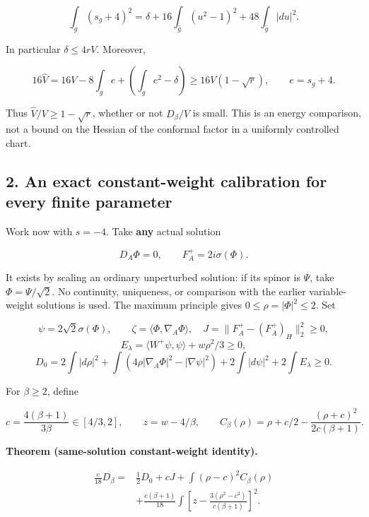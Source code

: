 \documentclass[
  10pt,
]{article}
\begin{document}
\[
 \boxed{\int_g(s_g+4)^2=\delta
 +16\int_{\widehat g}(u^2-1)^2+48\int_{\widehat g}|du|^2.}
 \tag{1.5}
\]

In particular \(\delta\le4rV\). Moreover,

\[
16\widehat V=16V-8\int_g e+\left(\int_g e^2-\delta\right)
\ge16V(1-\sqrt r),\qquad e=s_g+4.
\tag{1.6}
\]

Thus \(\widehat V/V\ge1-\sqrt r\), whether or not \(D_\beta/V\) is
small. This is an energy comparison, not a bound on the Hessian of the
conformal factor in a uniformly controlled chart.

\hypertarget{an-exact-constant-weight-calibration-for-every-finite-parameter}{%
\subsection{2. An exact constant-weight calibration for every finite
parameter}\label{an-exact-constant-weight-calibration-for-every-finite-parameter}}

Work now with \(s=-4\). Take \textbf{any} actual solution

\[
 D_A\Phi=0,\qquad F_A^+=2i\sigma(\Phi).
 \tag{2.1}
\]

It exists by scaling an ordinary unperturbed solution: if its spinor is
\(\Psi\), take \(\Phi=\Psi/\sqrt2\). No continuity, uniqueness, or
comparison with the earlier variable-weight solutions is used. The
maximum principle gives \(0\le\rho=|\Phi|^2\le2\). Set

\[
 \psi=2\sqrt2\sigma(\Phi),\qquad
 \zeta=\langle\Phi,\nabla_A\Phi\rangle,
 \quad J=\|F_A^+-(F_A^+)_H\|_2^2\ge0,
\] \[
 E_\lambda=\langle W^+\psi,\psi\rangle+w\rho^2/3\ge0,
\] \[
 D_0=2\int|d\rho|^2+
 \int(4\rho|\nabla_A\Phi|^2-|\nabla\psi|^2)
       +2\int|d\psi|^2+2\int E_\lambda\ge0.
 \tag{2.2}
\]

For \(\beta\ge2\), define

\[
 c=\frac{4(\beta+1)}{3\beta}\in[4/3,2],\qquad
 z=w-4/\beta,\qquad
 C_\beta(\rho)=\rho+c/2-\frac{(\rho+c)^2}{2c(\beta+1)}.
 \tag{2.3}
\]

\textbf{Theorem (same-solution constant-weight identity).}

\[
\boxed{\begin{aligned}
 \frac{c}{18}D_\beta={}&\frac12D_0+cJ
       +\int(\rho-c)^2 C_\beta(\rho)\\
 &+\frac{c(\beta+1)}{18}
       \int\left[z-\frac{3(\rho^2-c^2)}{c(\beta+1)}\right]^2.
\end{aligned}}
 \tag{2.4}
\]
\end{document}

